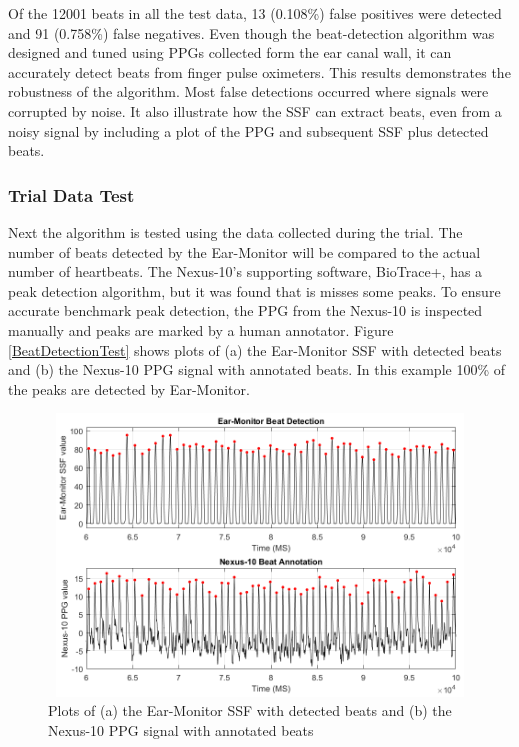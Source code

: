 Of the 12001 beats in all the test data, 13 (0.108\%) false positives were detected and 91 (0.758\%) false negatives. Even though the beat-detection algorithm was designed and tuned using PPGs collected form the ear canal wall, it can accurately detect beats from finger pulse oximeters. This results demonstrates the robustness of the algorithm. Most false detections occurred where signals were corrupted by noise. It also illustrate how the SSF can extract beats, even from a noisy signal by including a plot of the PPG and subsequent SSF plus detected beats.

\subsubsection{Trial Data Test}
Next the algorithm is tested using the data collected during the trial. The number of beats detected by the Ear-Monitor will be compared to the actual number of heartbeats. The Nexus-10's supporting software, BioTrace+, has a peak detection algorithm, but it was found that is misses some peaks. To ensure accurate benchmark peak detection, the PPG from the Nexus-10 is inspected manually and peaks are marked by a human annotator. Figure \ref{BeatDetectionTest} shows plots of (a) the Ear-Monitor SSF with detected beats and (b) the Nexus-10 PPG signal with annotated beats. In this example 100\% of the peaks are detected by Ear-Monitor.

\begin{figure}[H]
   \centering
   \includegraphics[width=12cm,height=7.5cm]{figs/BeatDetectionTest.png}
   \caption{Plots of (a) the Ear-Monitor SSF with detected beats and (b) the Nexus-10 PPG signal with annotated beats} %
   \label{fig:BeatDetectionTest}
\end{figure}

